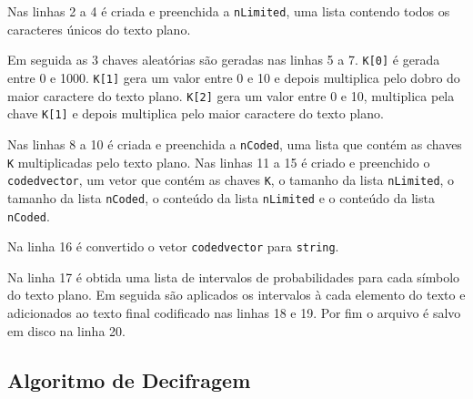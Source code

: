 Nas linhas 2 a 4 é criada e preenchida a \texttt{nLimited}, uma lista contendo todos os caracteres únicos do texto plano. 

Em seguida as 3 chaves aleatórias são geradas nas linhas 5 a 7. \texttt{K[0]} é gerada entre 0 e 1000. \texttt{K[1]} gera um valor entre 0 e 10 e depois multiplica pelo dobro do maior caractere do texto plano. \texttt{K[2]} gera um valor entre 0 e 10, multiplica pela chave \texttt{K[1]} e depois multiplica pelo maior caractere do texto plano.

Nas linhas 8 a 10 é criada e preenchida a \texttt{nCoded}, uma lista que contém as chaves \texttt{K} multiplicadas pelo texto plano. Nas linhas 11 a 15 é criado e preenchido o \texttt{codedvector}, um vetor que contém as chaves \texttt{K}, o tamanho da lista \texttt{nLimited}, o tamanho da lista \texttt{nCoded}, o conteúdo da lista \texttt{nLimited} e o conteúdo da lista \texttt{nCoded}.

Na linha 16 é convertido o vetor \texttt{codedvector} para \texttt{string}.

Na linha 17 é obtida uma lista de intervalos de probabilidades para cada símbolo do texto plano. Em seguida são aplicados os intervalos à cada elemento do texto e adicionados ao texto final codificado nas linhas 18 e 19. Por fim o arquivo é salvo em disco na linha 20.

\subsection{Algoritmo de Decifragem}

